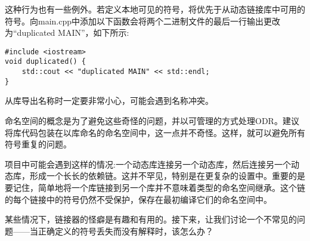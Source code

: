 这种行为也有一些例外。若定义本地可见的符号，将优先于从动态链接库中可用的符号。向main.cpp中添加以下函数会将两个二进制文件的最后一行输出更改为“duplicated MAIN”，如下所示:

\begin{lstlisting}[style=styleCXX]
#include <iostream>
void duplicated() {
	std::cout << "duplicated MAIN" << std::endl;
}
\end{lstlisting}

从库导出名称时一定要非常小心，可能会遇到名称冲突。


命名空间的概念是为了避免这些奇怪的问题，并以可管理的方式处理ODR。建议将库代码包装在以库命名的命名空间中，这一点并不奇怪。这样，就可以避免所有符号重复的问题。

项目中可能会遇到这样的情况:一个动态库连接另一个动态库，然后连接另一个动态库，形成一个长长的依赖链。这并不罕见，特别是在更复杂的设置中。重要的是要记住，简单地将一个库链接到另一个库并不意味着类型的命名空间继承。这个链的每个链接中的符号仍然不受保护，保存在最初编译它们的命名空间中。

某些情况下，链接器的怪癖是有趣和有用的。接下来，让我们讨论一个不常见的问题——当正确定义的符号丢失而没有解释时，该怎么办？













